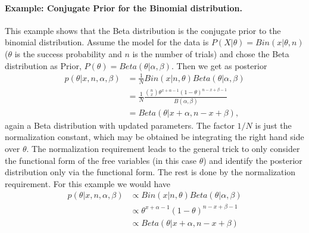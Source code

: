 \paragraph*{Example: Conjugate Prior for the Binomial distribution.} This example shows that the Beta distribution is the conjugate prior to the binomial distribution. Assume the model for the data is $P(X|\theta)=Bin(x|\theta, n)$ ($\theta$ is the success probability and $n$ is the number of trials) and chose the Beta distribution as Prior, $P(\theta) = Beta(\theta|\alpha, \beta) $. Then we get as posterior
\begin{align} \label{eq:beta_binom}
p(\theta |x, n, \alpha, \beta) &=\frac{1}{N} Bin(x|n,\theta) Beta(\theta|\alpha, \beta) \\
& = \frac{1}{N}  \frac{\binom {n} {x} \theta^{x + \alpha-1} (1-\theta)^{n-x+\beta -1}}{B(\alpha, \beta)}  \\
& = Beta(\theta | x + \alpha, n-x+\beta),
\end{align} 
again a Beta distribution with updated parameters. The factor $1/N$ is just the normalization constant, which may be obtained be integrating the right hand side over $\theta$. The normalization requirement leads to the general trick to only consider the functional form of the free variables (in this case $\theta$) and identify the posterior distribution only via the functional form. The rest is done by the normalization requirement. For this example we would have
\begin{align}
 p(\theta |x, n, \alpha, \beta) &\propto Bin(x|n,\theta) Beta(\theta|\alpha, \beta) \\ 
 &\propto \theta^{x + \alpha-1} (1-\theta)^{n-x+\beta -1} \\ 
 &\propto Beta(\theta | x + \alpha, n-x+\beta)
\end{align}

